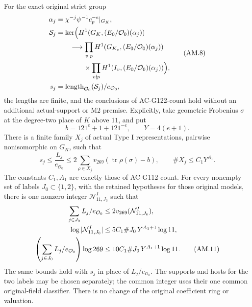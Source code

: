 \begin{theorem}
For the exact original strict group
\[
 \begin{split}
 \alpha_j&=\chi^{-j}\psi^{-1}c_p^{-e}|_{G_K},\\
 \mathcal S_j&=\ker\Bigl(
  H^1(G_K,(E_0/\mathcal O_0)(\alpha_j))\\
 &\qquad\longrightarrow
  \prod_{v\mid p}H^1(G_{K_v},(E_0/\mathcal O_0)(\alpha_j))\\
 &\qquad\qquad\times\prod_{v\nmid p}H^1(I_v,(E_0/\mathcal O_0)(\alpha_j))
                         \Bigr),\\
 s_j&=\operatorname{length}_{\mathcal O_0}(\mathcal S_j)/
                                      e_{\mathcal O_0},
 \end{split}
 \tag{AM.8}
\]
the lengths are finite, and the conclusions of AC-G122-count
hold without an additional actual-support or \(\mathrm{M2}\)
premise.  Explicitly, take geometric Frobenius \(\sigma\) at
the degree-two place of \(K\) above \(11\), and put
\[
             b=121^e+1+121^{-e},\qquad Y=4(e+1).
 \tag{AM.9}
\]
There is a finite family \(X_j\) of actual Type I representations,
pairwise nonisomorphic on \(G_K\), such that
\[
 s_j\le \frac{L_j}{e_{\mathcal O_0}}
 \le 2\sum_{\rho\in X_j}
               v_{269}(\operatorname{tr}\rho(\sigma)-b),
 \qquad \#X_j\le C_1Y^{A_1}.
 \tag{AM.10}
\]
The constants \(C_1,A_1\) are exactly those of AC-G112-count.
For every nonempty set of labels \(J_0\subset\{1,2\}\), with
the retained hypotheses for those original models, there is
one nonzero integer \(\mathcal N^I_{11,J_0}\) such that
\begin{align}
 \sum_{j\in J_0}L_j/e_{\mathcal O_0}
     &\le 2v_{269}(\mathcal N^I_{11,J_0}),\notag\\
 \log|\mathcal N^I_{11,J_0}|
     &\le 5C_1\#J_0\,Y^{A_1+1}\log11,\notag\\
 \left(\sum_{j\in J_0}L_j/e_{\mathcal O_0}\right)\log269
     &\le10C_1\#J_0\,Y^{A_1+1}\log11.
 \tag{AM.11}
\end{align}
The same bounds hold with \(s_j\) in place of \(L_j/e_{\mathcal O_0}\).
The supports and hosts for the two labels may be chosen separately;
the common integer uses their one common original-field classifier.
There is no change of the original coefficient ring or valuation.
\end{theorem}

